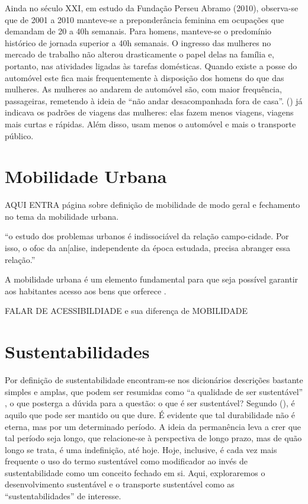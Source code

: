 Ainda no século XXI, em estudo da Fundação Perseu Abramo (2010), observa-se que de 2001 a 2010 manteve-se a preponderância feminina em ocupações que demandam de 20 a 40h semanais.
Para homens, manteve-se o predomínio histórico de jornada superior a 40h semanais. O ingresso das mulheres no mercado de trabalho não alterou drasticamente o papel delas na família e, portanto, nas atividades ligadas às
tarefas domésticas.
Quando existe a posse do automóvel este fica mais frequentemente à disposição dos homens do que das mulheres.
As mulheres ao andarem de automóvel são, com maior frequência, passageiras, remetendo à ideia de “não andar desacompanhada fora de casa”. (\citeyear{FOX1983}) já indicava os padrões de viagens das mulheres: elas fazem menos viagens, viagens mais curtas e rápidas. Além disso, usam menos o automóvel e mais o transporte público.

\clearpage
\section{Mobilidade Urbana}

AQUI ENTRA página sobre definição de mobilidade de modo geral e fechamento no tema da mobilidade urbana.

``o estudo dos problemas urbanos é indissociável da relação campo-cidade. Por isso, o ofoc da an[alise, independente da época estudada, precisa abranger essa relação.'' \cite[p.154]{FREITAG2007}

A mobilidade urbana é um elemento fundamental para que seja possível garantir aos habitantes acesso aos bens que orferece \cite{IEMA2010}.

FALAR DE ACESSIBILDIADE e sua diferença de MOBILIDADE

\clearpage
\section{Sustentabilidades}

Por definição de sustentabilidade encontram-se nos dicionários descrições bastante simples e amplas, que podem ser resumidas como ``a qualidade de ser sustentável'' \cite{MICHAELIS2014}, o que posterga a dúvida para a questão: o que é ser sustentável? Segundo  (\citeyear{BLACK2010}), é aquilo que pode ser mantido ou que dure. É evidente que tal durabilidade não é eterna, mas por um determinado período. A ideia da permanência leva a crer que tal período seja longo, que relacione-se à perspectiva de longo prazo, mas de quão longo se trata, é uma indefinição, até hoje. Hoje, inclusive, é cada vez mais frequente o uso do termo sustentável como modificador ao invés de sustentabilidade como um conceito fechado em si. Aqui, exploraremos o desenvolvimento  sustentável e o transporte sustentável como as ``sustentabilidades'' de interesse.


